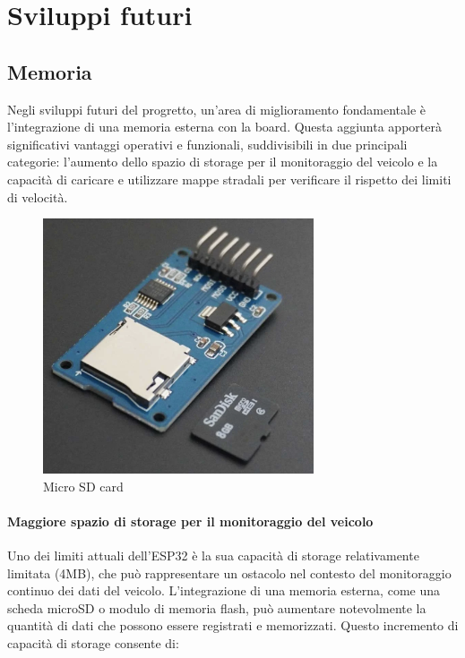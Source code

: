 \documentclass[12pt, a4paper, italian]{report}
\numberwithin{figure}{chapter}
\numberwithin{table}{chapter}
\begin{document}
\section{Sviluppi futuri}
\subsection{Memoria}
Negli sviluppi futuri del progretto, un'area di miglioramento fondamentale è l'integrazione di una memoria esterna con la board. Questa aggiunta apporterà significativi vantaggi operativi e funzionali, suddivisibili in due principali categorie: l'aumento dello spazio di storage per il monitoraggio del veicolo e la capacità di caricare e utilizzare mappe stradali per verificare il rispetto dei limiti di velocità.

\begin{figure}[h]
  \centering
  \includegraphics[width=8cm]{MicroSD.png}
  \caption{Micro SD card}
  \label{fig:MicroSD}
\end{figure}

\paragraph{Maggiore spazio di storage per il monitoraggio del veicolo} 
Uno dei limiti attuali dell'ESP32 è la sua capacità di storage relativamente limitata (4MB), che può rappresentare un ostacolo nel contesto del monitoraggio continuo dei dati del veicolo. L'integrazione di una memoria esterna, come una scheda microSD o modulo di memoria flash, può aumentare notevolmente la quantità di dati che possono essere registrati e memorizzati. Questo incremento di capacità di storage consente di:
\end{document}
